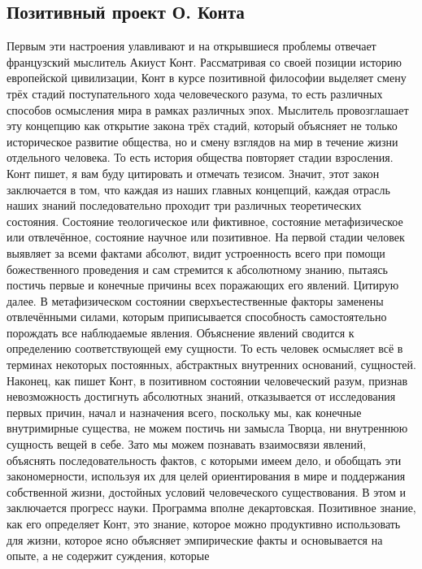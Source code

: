 \subsection{Позитивный проект О. Конта}

Первым эти настроения улавливают и на
открывшиеся проблемы отвечает французский мыслитель Акиуст Конт. Рассматривая со
своей позиции историю европейской цивилизации, Конт в курсе позитивной философии
выделяет смену трёх стадий поступательного хода человеческого разума, то есть
различных способов осмысления мира в рамках различных эпох. Мыслитель
провозглашает эту концепцию как открытие закона трёх стадий, который объясняет
не только историческое развитие общества, но и смену взглядов на мир в течение
жизни отдельного человека. То есть история общества повторяет стадии взросления.
Конт пишет, я вам буду цитировать и отмечать тезисом. Значит, этот закон
заключается в том, что каждая из наших главных концепций, каждая отрасль наших
знаний последовательно проходит три различных теоретических состояния. Состояние
теологическое или фиктивное, состояние метафизическое или отвлечённое, состояние
научное или позитивное. На первой стадии человек выявляет за всеми фактами
абсолют, видит устроенность всего при помощи божественного проведения и сам
стремится к абсолютному знанию, пытаясь постичь первые и конечные причины всех
поражающих его явлений. Цитирую далее. В метафизическом состоянии
сверхъестественные факторы заменены отвлечёнными силами, которым приписывается
способность самостоятельно порождать все наблюдаемые явления. Объяснение явлений
сводится к определению соответствующей ему сущности. То есть человек осмысляет
всё в терминах некоторых постоянных, абстрактных внутренних оснований,
сущностей. Наконец, как пишет Конт, в позитивном состоянии человеческий разум,
признав невозможность достигнуть абсолютных знаний, отказывается от исследования
первых причин, начал и назначения всего, поскольку мы, как конечные внутримирные
существа, не можем постичь ни замысла Творца, ни внутреннюю сущность вещей в
себе. Зато мы можем познавать взаимосвязи явлений, объяснять последовательность
фактов, с которыми имеем дело, и обобщать эти закономерности, используя их для
целей ориентирования в мире и поддержания собственной жизни, достойных условий
человеческого существования. В этом и заключается прогресс науки. Программа
вполне декартовская. Позитивное знание, как его определяет Конт, это знание,
которое можно продуктивно использовать для жизни, которое ясно объясняет
эмпирические факты и основывается на опыте, а не содержит суждения, которые
